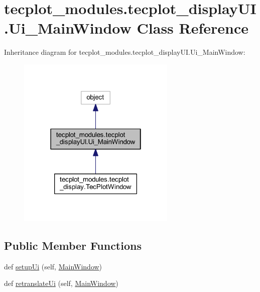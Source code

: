 \hypertarget{classtecplot__modules_1_1tecplot__display_u_i_1_1_ui___main_window}{}\section{tecplot\+\_\+modules.\+tecplot\+\_\+display\+U\+I.\+Ui\+\_\+\+Main\+Window Class Reference}
\label{classtecplot__modules_1_1tecplot__display_u_i_1_1_ui___main_window}


Inheritance diagram for tecplot\+\_\+modules.\+tecplot\+\_\+display\+U\+I.\+Ui\+\_\+\+Main\+Window\+:\nopagebreak
\begin{figure}[H]
\begin{center}
\leavevmode
\includegraphics[width=214pt]{classtecplot__modules_1_1tecplot__display_u_i_1_1_ui___main_window__inherit__graph}
\end{center}
\end{figure}
\subsection*{Public Member Functions}
\begin{DoxyCompactItemize}
\item 
def \hyperlink{classtecplot__modules_1_1tecplot__display_u_i_1_1_ui___main_window_a84d83568b72995fc1f091c00044adb72}{setup\+Ui} (self, \hyperlink{namespacetecplot__modules_1_1tecplot__display_u_i_a05b56eca3c779fabf41fa975030e6ca1}{Main\+Window})
\item 
def \hyperlink{classtecplot__modules_1_1tecplot__display_u_i_1_1_ui___main_window_ae1811975426f7bbfcbe9bd6ae8a4d444}{retranslate\+Ui} (self, \hyperlink{namespacetecplot__modules_1_1tecplot__display_u_i_a05b56eca3c779fabf41fa975030e6ca1}{Main\+Window})
\end{DoxyCompactItemize}

